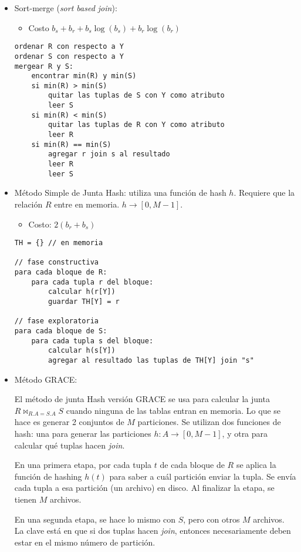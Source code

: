 \documentclass[a4paper, twoside]{article}
\begin{document}
\begin{itemize}
\item Sort-merge (\emph{sort based join}): 

\begin{itemize}
\item Costo $b_{s}+b_{r}+b_{s}\log(b_{s})+b_{r}\log(b_{r})$
\end{itemize}

\begin{lstlisting}
ordenar R con respecto a Y
ordenar S con respecto a Y
mergear R y S:
	encontrar min(R) y min(S)
	si min(R) > min(S)
		quitar las tuplas de S con Y como atributo
		leer S
	si min(R) < min(S)
		quitar las tuplas de R con Y como atributo
		leer R
	si min(R) == min(S)
		agregar r join s al resultado
		leer R
		leer S
\end{lstlisting}


\item Método Simple de Junta Hash: utiliza una función de hash $h$. Requiere
que la relación $R$ entre en memoria. $h\to[0,M-1]$.

\begin{itemize}
\item Costo: $2\left(b_{r}+b_{s}\right)$
\end{itemize}

\begin{lstlisting}
TH = {} // en memoria

// fase constructiva
para cada bloque de R:
	para cada tupla r del bloque:
		calcular h(r[Y])
		guardar TH[Y] = r

// fase exploratoria
para cada bloque de S:
	para cada tupla s del bloque:
		calcular h(s[Y])
		agregar al resultado las tuplas de TH[Y] join "s"
\end{lstlisting}


\item Método GRACE:


El método de junta Hash versión GRACE se usa para calcular la junta
$R\bowtie_{R.A=S.A}S$ cuando ninguna de las tablas entran en memoria.
Lo que se hace es generar 2 conjuntos de $M$ particiones. Se utilizan
dos funciones de hash: una para generar las particiones $h:A\to[0,M-1]$,
y otra para calcular qué tuplas hacen \emph{join}.


En una primera etapa, por cada tupla $t$ de cada bloque de $R$ se
aplica la función de hashing $h(t)$ para saber a cuál partición enviar
la tupla. Se envía cada tupla a esa partición (un archivo) en disco.
Al finalizar la etapa, se tienen $M$ archivos.


En una segunda etapa, se hace lo mismo con $S$, pero con otros $M$
archivos. La clave está en que si dos tuplas hacen \emph{join}, entonces
necesariamente deben estar en el mismo número de partición. 



\end{itemize}
\end{document}
